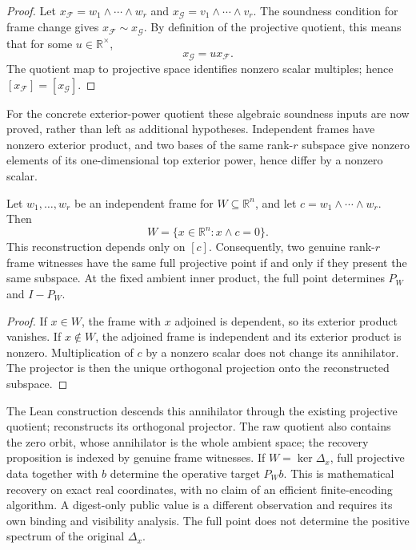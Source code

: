 \begin{proof}
Let \(x_{\mathcal F}=w_1\wedge\cdots\wedge w_r\) and
\(x_{\mathcal G}=v_1\wedge\cdots\wedge v_r\). The soundness condition for
frame change gives \(x_{\mathcal F}\sim x_{\mathcal G}\). By definition of the
projective quotient, this means that for some \(u\in\mathbb R^\times\),
\[
  x_{\mathcal G}=u x_{\mathcal F}.
\]
The quotient map to projective space identifies nonzero scalar multiples; hence
\([x_{\mathcal F}]=[x_{\mathcal G}]\).
\end{proof}

For the concrete exterior-power quotient these algebraic soundness inputs are
now proved, rather than left as additional hypotheses. Independent frames have
nonzero exterior product, and two bases of the same rank-\(r\) subspace give
nonzero elements of its one-dimensional top exterior power, hence differ by
a nonzero scalar.

\begin{proposition}
\label{prop:plucker-recovery}
Let \(w_1,\ldots,w_r\) be an independent frame for \(W\subseteq\mathbb R^n\),
and let \(c=w_1\wedge\cdots\wedge w_r\). Then
\[
 W=\{x\in\mathbb R^n:x\wedge c=0\}.
\]
This reconstruction depends only on \([c]\). Consequently, two genuine
rank-\(r\) frame witnesses have the same full projective point if and only
if they present the same subspace. At the fixed ambient inner product, the
full point determines \(P_W\) and \(I-P_W\).
\end{proposition}
\begin{proof}
If \(x\in W\), the frame with \(x\) adjoined is dependent, so its exterior
product vanishes. If \(x\notin W\), the adjoined frame is independent and its
exterior product is nonzero. Multiplication of \(c\) by a nonzero scalar
does not change its annihilator. The projector is then the unique orthogonal
projection onto the reconstructed subspace.
\end{proof}

The Lean construction  descends this
annihilator through the existing projective quotient;
 reconstructs its orthogonal projector.
The raw quotient also contains the zero orbit, whose annihilator is the whole
ambient space; the recovery proposition is indexed by genuine frame witnesses.
If \(W=\ker\Delta_x\), full projective data together with \(b\) determine
the operative target \(P_Wb\). This is mathematical recovery on exact real
coordinates, with no claim of an efficient finite-encoding algorithm. A
digest-only public value is a different observation and requires its own
binding and visibility analysis. The full point does not determine the
positive spectrum of the original \(\Delta_x\).

